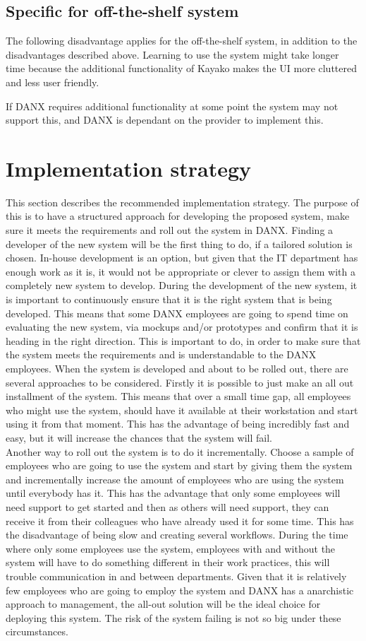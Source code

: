 \subsection{Specific for off-the-shelf system}
The following disadvantage applies for the off-the-shelf system, in addition to the disadvantages described above. Learning to use the system might take longer time because the additional functionality of Kayako makes the UI more cluttered and less user friendly.

If DANX requires additional functionality at some point the system may not support this, and DANX is dependant on the provider to implement this.


\section{Implementation strategy}
This section describes the recommended implementation strategy. The purpose of this is to have a structured approach for developing the proposed system, make sure it meets the requirements and roll out the system in DANX.
Finding a developer of the new system will be the first thing to do, if a tailored solution is chosen. In-house development is an option, but given that the IT department has enough work as it is, it would not be appropriate or clever to assign them with a completely new system to develop.
During the development of the new system, it is important to continuously ensure that it is the right system that is being developed. This means that some DANX employees are going to spend time on evaluating the new system, via mockups and/or prototypes and confirm that it is heading in the right direction. This is important to do, in order to make sure that the system meets the requirements and is understandable to the DANX employees.
When the system is developed and about to be rolled out, there are several approaches to be considered. Firstly it is possible to just make an all out installment of the system. This means that over a small time gap, all employees who might use the system, should have it available at their workstation and start using it from that moment. This has the advantage of being incredibly fast and easy, but it will increase the chances that the system will fail.\\
Another way to roll out the system is to do it incrementally. Choose a sample of employees who are going to use the system and start by giving them the system and incrementally increase the amount of employees who are using the system until everybody has it. This has the advantage that only some employees will need support to get started and then as others will need support, they can receive it from their colleagues who have already used it for some time. This has the disadvantage of being slow and creating several workflows. During the time where only some employees use the system, employees with and without the system will have to do something different in their work practices, this will trouble communication in and between departments. Given that it is relatively few employees who are going to employ the system and DANX has a anarchistic approach to management, the all-out solution will be the ideal choice for deploying this system. The risk of the system failing is not so big under these circumstances.
